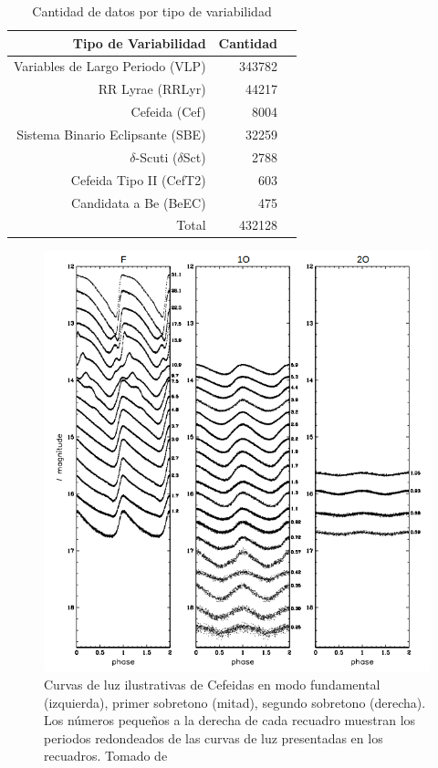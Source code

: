 \documentclass[letterpaper,12pt]{book}
\begin{document}
\begin{table}[ht]
  \centering
  \begin{tabular}{rrr}
    \hline
    Tipo de Variabilidad & Cantidad \\
    \hline
    Variables de Largo Periodo (VLP) & 343782 \\
    RR Lyrae (RRLyr) & 44217\\
    Cefeida (Cef)& 8004\\
    Sistema Binario Eclipsante (SBE)&32259 \\
    $\delta$-Scuti ($\delta$Sct)& 2788\\
    Cefeida Tipo II (CefT2)& 603\\
    Candidata a Be (BeEC)& 475\\
    \hline
    Total & 432128\\
    \hline
  \end{tabular}
  \caption{Cantidad de datos por tipo de variabilidad}
  \label{cuadro:cantidadDatos}
\end{table}

\begin{figure}
  \includegraphics[width = \textwidth]{./img/C2Datos/tiposCefeidas.png}
  \caption{Curvas de luz ilustrativas de Cefeidas en modo fundamental (izquierda), primer sobretono (mitad), segundo sobretono (derecha). Los números pequeños a la derecha de cada recuadro muestran los periodos redondeados de las curvas de luz presentadas en los recuadros. Tomado de \cite{soszynski_optical_2011}}
  \label{fig:tiposCefeidas}
\end{figure}
\end{document}
